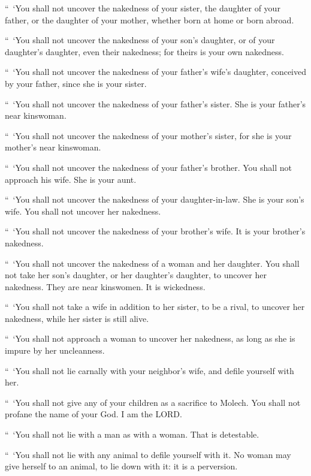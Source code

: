 \myverse{}“ ‘You shall not uncover the nakedness of your sister, the daughter
of your father, or the daughter of your mother, whether born at home or born abroad.


\myverse{}“ ‘You shall not uncover the nakedness of your son’s daughter,
or of your daughter’s daughter, even their nakedness; for theirs is your own nakedness.


\myverse{}“ ‘You shall not uncover the nakedness of your father’s wife’s
daughter, conceived by your father, since she is your sister.


\myverse{}“ ‘You shall not uncover the nakedness of your father’s sister.
She is your father’s near kinswoman.


\myverse{}“ ‘You shall not uncover the nakedness of your mother’s sister,
for she is your mother’s near kinswoman.


\myverse{}“ ‘You shall not uncover the nakedness of your father’s brother.
You shall not approach his wife. She is your aunt.


\myverse{}“ ‘You shall not uncover the nakedness of your daughter-in-law.
She is your son’s wife. You shall not uncover her nakedness.


\myverse{}“ ‘You shall not uncover the nakedness of your brother’s wife.
It is your brother’s nakedness.


\myverse{}“ ‘You shall not uncover the nakedness of a woman and her daughter.
You shall not take her son’s daughter, or her daughter’s daughter, to uncover her nakedness. They are
near kinswomen. It is wickedness.


\myverse{}“ ‘You shall not take a wife in addition to her sister, to be
a rival, to uncover her nakedness, while her sister is still alive.


\myverse{}“ ‘You shall not approach a woman to uncover her nakedness, as
long as she is impure by her uncleanness.


\myverse{}“ ‘You shall not lie carnally with your neighbor’s wife, and
defile yourself with her.


\myverse{}“ ‘You shall not give any of your children as a sacrifice to
Molech. You shall not profane the name of your God. I am the LORD.


\myverse{}“ ‘You shall not lie with a man as with a woman. That is detestable.


\myverse{}“ ‘You shall not lie with any animal to defile yourself with
it. No woman may give herself to an animal, to lie down with it: it is a perversion.


